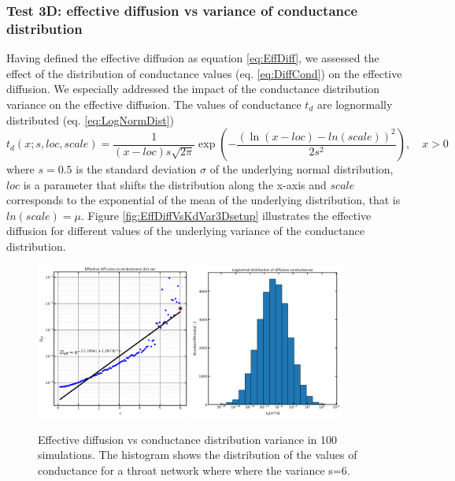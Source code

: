 \documentclass{article}
\begin{document}
\FloatBarrier  %
\subsubsection{Test 3D: effective diffusion vs variance of conductance distribution}
Having defined the effective diffusion as equation \ref{eq:EffDiff}, we assessed the effect of the distribution of conductance values (eq. \ref{eq:DiffCond}) on the effective diffusion. We especially addressed the impact of the conductance distribution variance on the effective diffusion. The values of conductance $t_d$ are lognormally distributed (eq. \ref{eq:LogNormDist})
\begin{equation}
    t_d(x; s, loc, scale) = \frac{1}{(x-loc) s \sqrt{2 \pi}} \exp\left( -\frac{(\ln(x-loc) - ln(scale))^2}{2 s^2} \right), \quad x > 0
    \label{eq:LogNormDist}
\end{equation}
where $s=0.5$ is the standard deviation $\sigma$ of the underlying normal distribution, $loc$ is a parameter that shifts the distribution along the x-axis and $scale$ corresponds to the exponential of the mean of the underlying distribution, that is $ln(scale)=\mu$. Figure \ref{fig:EffDiffVsKdVar3Dsetup} illustrates the effective diffusion for different values of the underlying variance of the conductance distribution.
\begin{figure}[htbp]
    \centering
    \includegraphics[width=0.45\textwidth]{images/fromOpenPNM/EffDiffVsKdVar.png}
    \hspace{0.05\textwidth}
    \includegraphics[width=0.45\textwidth]{images/fromOpenPNM/logNormKd3D.png}
    \caption{Effective diffusion vs conductance distribution variance in 100 simulations. The histogram shows the distribution of the values of conductance for a throat network where where the variance s=6.}
    \label{fig:EffDiffVsKdVar}
\end{figure}
\end{document}
